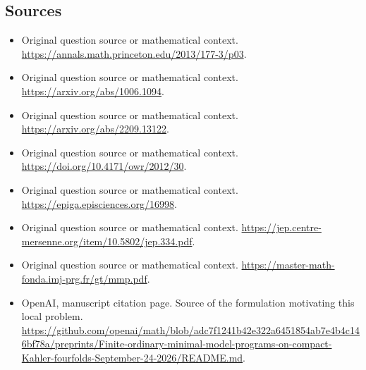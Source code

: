 \documentclass[11pt]{article}
\begin{document}
\subsection{Sources}
\begin{itemize}
\item[S1] Original question source or mathematical context.
\url{https://annals.math.princeton.edu/2013/177-3/p03}.
\item[S2] Original question source or mathematical context.
\url{https://arxiv.org/abs/1006.1094}.
\item[S3] Original question source or mathematical context.
\url{https://arxiv.org/abs/2209.13122}.
\item[S4] Original question source or mathematical context.
\url{https://doi.org/10.4171/owr/2012/30}.
\item[S5] Original question source or mathematical context.
\url{https://epiga.episciences.org/16998}.
\item[S6] Original question source or mathematical context.
\url{https://jep.centre-mersenne.org/item/10.5802/jep.334.pdf}.
\item[S7] Original question source or mathematical context.
\url{https://master-math-fonda.imj-prg.fr/gt/mmp.pdf}.
\item[S8] OpenAI, manuscript citation page. Source of the formulation motivating this local problem.
\url{https://github.com/openai/math/blob/adc7f1241b42e322a6451854ab7e4b4c146bf78a/preprints/Finite-ordinary-minimal-model-programs-on-compact-Kahler-fourfolds-September-24-2026/README.md}.
\end{itemize}
\end{document}
